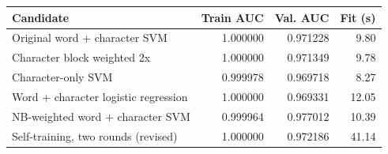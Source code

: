 \par\noindent
\begin{tabularx}{\linewidth}{@{}Yrrr@{}}
\toprule
Candidate & Train AUC & Val. AUC & Fit (s) \\
\midrule
Original word + character SVM & 1.000000 & 0.971228 & 9.80 \\
Character block weighted 2x & 1.000000 & 0.971349 & 9.78 \\
Character-only SVM & 0.999978 & 0.969718 & 8.27 \\
Word + character logistic regression & 1.000000 & 0.969331 & 12.05 \\
NB-weighted word + character SVM & 0.999964 & 0.977012 & 10.39 \\
Self-training, two rounds (revised) & 1.000000 & 0.972186 & 41.14 \\
\bottomrule
\end{tabularx}
\par

